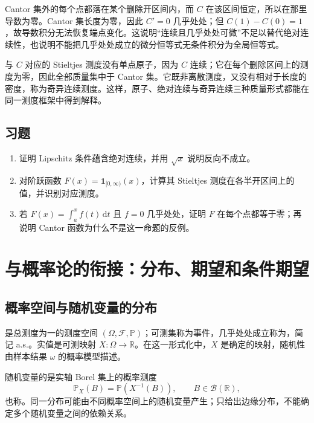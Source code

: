 \documentclass[UTF8,12pt,a4paper,fontset=fandol]{ctexbook}
\begin{document}
Cantor 集外的每个点都落在某个删除开区间内，而 $C$ 在该区间恒定，所以在那里导数为零。Cantor 集长度为零，因此 $C'=0$ 几乎处处；但 $C(1)-C(0)=1$，故导数积分无法恢复端点变化。这说明“连续且几乎处处可微”不足以替代绝对连续性，也说明不能把几乎处处成立的微分恒等式无条件积分为全局恒等式。

与 $C$ 对应的 Stieltjes 测度没有单点原子，因为 $C$ 连续；它在每个删除区间上的测度为零，因此全部质量集中于 Cantor 集。它既非离散测度，又没有相对于长度的密度，称为奇异连续测度。这样，原子、绝对连续与奇异连续三种质量形式都能在同一测度框架中得到解释。

\section{习题}
\begin{enumerate}
 \item 证明 Lipschitz 条件蕴含绝对连续，并用 $\sqrt{x}$ 说明反向不成立。
 \item 对阶跃函数 $F(x)=\mathbf1_{[0,\infty)}(x)$，计算其 Stieltjes 测度在各半开区间上的值，并识别对应测度。
 \item 若 $F(x)=\int_a^xf(t)\,\mathrm dt$ 且 $f=0$ 几乎处处，证明 $F$ 在每个点都等于零；再说明 Cantor 函数为什么不是这一命题的反例。
\end{enumerate}

\chapter{与概率论的衔接：分布、期望和条件期望}
\label{chap:mt-probability}

\section{概率空间与随机变量的分布}
是总测度为一的测度空间 $(\Omega,\mathcal F,\mathbb P)$；可测集称为事件，几乎处处成立称为，简记 a.s.。实值是可测映射 $X:\Omega\to\mathbb R$。在这一形式化中，$X$ 是确定的映射，随机性由样本结果 $\omega$ 的概率模型描述。

随机变量的是实轴 Borel 集上的概率测度
\begin{equation}
 \mathbb P_X(B)=\mathbb P(X^{-1}(B)),\qquad B\in\mathcal B(\mathbb R),
 \label{eq:mt-pushforward}
\end{equation}
也称。同一分布可能由不同概率空间上的随机变量产生；只给出边缘分布，不能确定多个随机变量之间的依赖关系。
\end{document}
